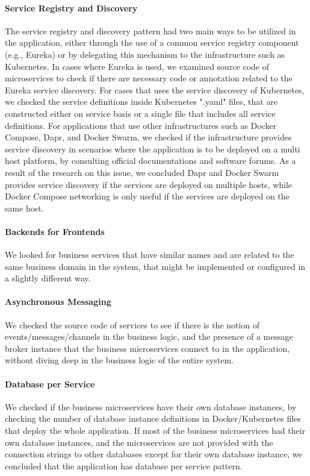 \documentclass{Configuration_Files/PoliMi3i_thesis}
\begin{document}
\paragraph{Service Registry and Discovery} The service registry and discovery pattern had two main ways to be utilized in the application, either through the use of a common service registry component (e.g., Eureka) or by delegating this mechanism to the infrastructure such as Kubernetes.
In cases where Eureka is used, we examined source code of microservices to check if there are necessary code or annotation related to the Eureka service discovery.
For cases that uses the service discovery of Kubernetes, we checked the service definitions inside Kubernetes ".yaml" files, that are constructed either on service basis or a single file that includes all service definitions.
For applications that use other infrastructures such as Docker Compose, Dapr, and Docker Swarm, we checked if the infrastructure provides service discovery in scenarios where the application is to be deployed on a multi host platform, by consulting official documentations and software forums.
As a result of the research on this issue, we concluded Dapr and Docker Swarm provides service discovery if the services are deployed on multiple hosts, while Docker Compose networking is only useful if the services are deployed on the same host.

\paragraph{Backends for Frontends} We looked for business services that have similar names and are related to the same business domain in the system, that might be implemented or configured in a slightly different way.

\paragraph{Asynchronous Messaging} We checked the source code of services to see if there is the notion of events/messages/channels in the business logic, and the presence of a message broker instance that the business microservices connect to in the application, without diving deep in the business logic of the entire system.

\paragraph{Database per Service} We checked if the business microservices have their own database instances, by checking the number of database instance definitions in Docker/Kubernetes files that deploy the whole application.
If most of the business microservices had their own database instances, and the microservices are not provided with the connection strings to other databases except for their own database instance, we concluded that the application has database per service pattern.
\end{document}
